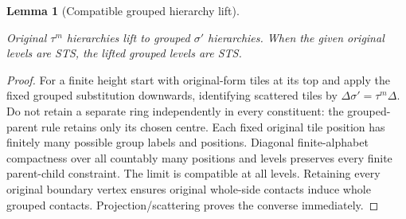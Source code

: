 \documentclass[11pt,a4paper]{article}
\newtheorem{lemma}[definition]{Lemma}
\theoremstyle{remark}
\newcommand{\lean}[1]{}
\newcommand{\uses}[1]{}
\begin{document}
\begin{lemma}[Compatible grouped hierarchy lift]\label{lem:grouping-lift}
\lean{Tilings.Grouping.hierarchy_lift_iff}
\uses{def:certificate,def:hierarchy,lem:localfinite}
Original $\tau^m$ hierarchies lift to grouped $\sigma'$ hierarchies.
When the given original levels are STS, the lifted grouped levels are STS.
\end{lemma}
\begin{proof}
For a finite height start with original-form tiles at its top and apply the
fixed grouped substitution downwards, identifying scattered tiles by
$\Delta\sigma'=\tau^m\Delta$. Do not retain a separate ring independently
in every constituent: the grouped-parent rule retains only its chosen centre.
Each fixed original tile position has finitely many possible group labels
and positions. Diagonal finite-alphabet compactness over all countably many
positions and levels preserves every finite parent-child constraint.
The limit is compatible at all levels. Retaining every original boundary
vertex ensures original whole-side contacts induce whole grouped contacts.
Projection/scattering proves the converse immediately.
\end{proof}
\end{document}
